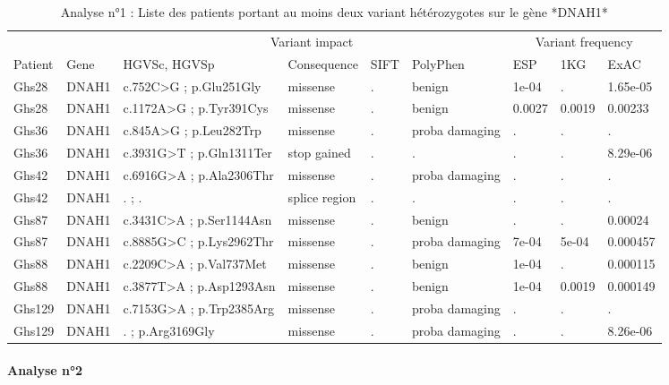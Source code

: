 \documentclass[12pt,twoside]{reedthesis}
\theoremstyle{definition}
\theoremstyle{definition}
\theoremstyle{remark}
\begin{document}
  \begin{landscape}
  \begin{longtable}[t]{lllllllll}
  \caption{\label{tab:tabdnah1low}Analyse n°1 : Liste des patients portant au moins deux variant hétérozygotes sur le gène *DNAH1*}\\
  \toprule
  \multicolumn{1}{c}{ } & \multicolumn{1}{c}{ } & \multicolumn{4}{c}{Variant impact} & \multicolumn{3}{c}{Variant frequency} \\
  \cmidrule(l{2pt}r{2pt}){3-6} \cmidrule(l{2pt}r{2pt}){7-9}
  Patient & Gene & HGVSc, HGVSp & Consequence & SIFT & PolyPhen & ESP & 1KG & ExAC\\
  \midrule
  Ghs28 & DNAH1 & c.752C>G ; p.Glu251Gly & missense & . & benign & 1e-04 & . & 1.65e-05\\
  Ghs28 & DNAH1 & c.1172A>G ; p.Tyr391Cys & missense & . & benign & 0.0027 & 0.0019 & 0.00233\\
  Ghs36 & DNAH1 & c.845A>G ; p.Leu282Trp & missense & . & proba damaging & . & . & .\\
  Ghs36 & DNAH1 & c.3931G>T ; p.Gln1311Ter & stop gained & . & . & . & . & 8.29e-06\\
  Ghs42 & DNAH1 & c.6916G>A ; p.Ala2306Thr & missense & . & proba damaging & . & . & .\\
  \addlinespace
  Ghs42 & DNAH1 & . ; . & splice region & . & . & . & . & .\\
  Ghs87 & DNAH1 & c.3431C>A ; p.Ser1144Asn & missense & . & benign & . & . & 0.00024\\
  Ghs87 & DNAH1 & c.8885G>C ; p.Lys2962Thr & missense & . & proba damaging & 7e-04 & 5e-04 & 0.000457\\
  Ghs88 & DNAH1 & c.2209C>A ; p.Val737Met & missense & . & benign & 1e-04 & . & 0.000115\\
  Ghs88 & DNAH1 & c.3877T>A ; p.Asp1293Asn & missense & . & benign & 1e-04 & 0.0019 & 0.000149\\
  \addlinespace
  Ghs129 & DNAH1 & c.7153G>A ; p.Trp2385Arg & missense & . & proba damaging & . & . & .\\
  Ghs129 & DNAH1 & . ; p.Arg3169Gly & missense & . & proba damaging & . & . & 8.26e-06\\
  \bottomrule
  \end{longtable}
  \end{landscape}
  
  \newpage
  
  \paragraph{Analyse n°2}\label{analyse-n2}
  
\end{document}
